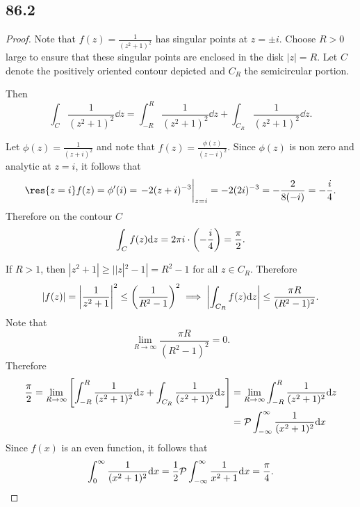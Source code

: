 \documentclass[12pt]{extarticle}
\begin{document}
\subsection*{86.2}
\begin{proof}
    Note that $f(z) = \frac{1}{(z^2 + 1)^2}$ has singular points at $z = \pm i$. Choose $R > 0$ large to ensure that these singular points are enclosed in the disk $|z| = R$. Let $C$ denote the positively oriented contour depicted and $C_R$ the semicircular portion.
    \begin{center}
    \end{center}
    Then
    \[
        \int_{C} \frac{1}{(z^2+1)^2} \dd z = \int_{-R}^R \frac{1}{(z^2 + 1)^2} \dd z + \int_{C_R} \frac{1}{(z^2 + 1)^2} \dd z
    .\]

    Let $\phi(z) = \frac{1}{(z+i)^2}$ and note that $f(z) = \frac{\phi(z)}{(z-i)^2}$. Since $\phi(z)$ is non zero and analytic at $z=i$, it follows that
    \[
        \res{z = i} f(z) = \phi'(i) = \eval{
            -2 (z+i)^{-3}
        }_{z=i} = -2 (2i)^{-3} = -\frac{2}{8(-i)} = -\frac{i}{4}
    .\]
    Therefore on the contour $C$
    \[
        \int_C f(z) \dd z = 2 \pi i \cdot \qty(-\frac{i}{4}) = \frac{\pi}{2}
    .\]

    If $R > 1$, then $|z^2 + 1| \geq ||z|^2 - 1| = R^2 - 1$ for all $z \in C_R$. Therefore
    \[
        |f(z)| = \qty|\frac{1}{z^2+1}|^2 \leq \qty(\frac{1}{R^2 - 1})^2 \implies \qty|\int_{C_R} f(z) \dd z| \leq \frac{\pi R}{(R^2 - 1)^2}
    .\]
    Note that
    \[
        \lim_{R \to \infty} \frac{\pi R}{(R^2 - 1)^2} = 0
    .\]
    Therefore
    \begin{align*}
        \frac{\pi}{2} = \lim_{R \to \infty} \qty[
        \int_{-R}^R \frac{1}{(z^2+1)^2} \dd z + \int_{C_R} \frac{1}{(z^2+1)^2} \dd z
        ] &= \lim_{R \to \infty} \int_{-R}^R \frac{1}{(z^2+1)^2} \dd z \\ 
          &= \pv \int_{-\infty}^\infty \frac{1}{(x^2+1)^2} \dd x
    \end{align*}
    Since $f(x)$ is an even function, it follows that
    \[
        \int_0^\infty \frac{1}{(x^2 + 1)^2} \dd x = \frac{1}{2} \pv \int_{-\infty}^\infty \frac{1}{x^2+1} \dd x = \frac{\pi}{4}
    .\qedhere\]
\end{proof}
\end{document}
